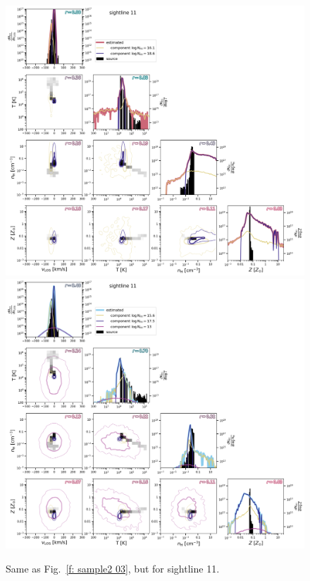 \documentclass[fleqn,usenatbib]{mnras}
\begin{document}
\begin{figure}
    \centering
    \includegraphics[height=0.45\textheight]{figures/sample2/original/sightline_0011.png}
    \includegraphics[height=0.45\textheight]{figures/sample2/high-z/sightline_0011.png}
    \label{f: sample2 11 corner}
    \caption{Same as Fig.~\ref{f: sample2 03}, but for sightline 11.}
\end{figure}
\end{document}
